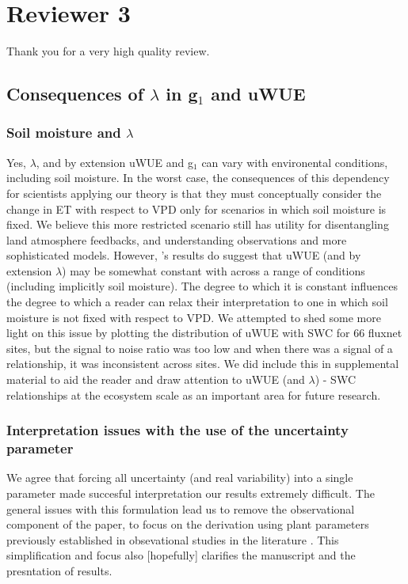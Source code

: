 \documentclass[12pt]{article}
\begin{document}
\section{Reviewer 3}

Thank you for a very high quality review.

\subsection{Consequences of $\lambda$ in g$_1$ and uWUE}

\subsubsection{Soil moisture and $\lambda$}

Yes, $\lambda$, and by extension uWUE and g$_1$ can vary with
environental conditions, including soil moisture. In the worst case,
the consequences of this dependency for scientists applying our theory
is that they must conceptually consider the change in ET with respect
to VPD only for scenarios in which soil moisture is fixed. We believe
this more restricted scenario still has utility for disentangling land
atmosphere feedbacks, and understanding observations and more
sophisticated models. However, \cite{Zhou_2015}'s results do suggest
that uWUE (and by extension $\lambda$) may be somewhat constant with
across a range of conditions (including implicitly soil moisture). The
degree to which it is constant influences the degree to which a reader
can relax their interpretation to one in which soil moisture is not
fixed with respect to VPD. We attempted to shed some more light on
this issue by plotting the distribution of uWUE with SWC for 66
fluxnet sites, but the signal to noise ratio was too low and when
there was a signal of a relationship, it was inconsistent across
sites. We did include this in supplemental material to aid the reader
and draw attention to uWUE (and $\lambda$) - SWC relationships at the
ecosystem scale as an important area for future research.

\subsubsection{Interpretation issues with the use of the uncertainty
  parameter}

We agree that forcing all uncertainty (and real variability) into a
single parameter made succesful interpretation our results extremely
difficult. The general issues with this formulation lead us to remove
the observational component of the paper, to focus on the derivation
using plant parameters previously established in obsevational studies
in the literature \citep{Zhou_2015, Medlyn_2017}. This simplification
and focus also [hopefully] clarifies the manuscript and the
presntation of results.
\end{document}
